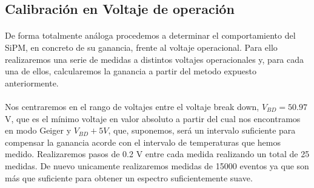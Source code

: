 \documentclass[11pt, a4paper]{article}
\begin{document}
\subsection {Calibración en Voltaje de operación}
\paragraph {}
De forma totalmente análoga procedemos a determinar el comportamiento del SiPM, en concreto de su ganancia, frente al voltaje operacional. Para ello realizaremos una serie de medidas a distintos voltajes operacionales y, para cada una de ellos, calcularemos la ganancia a partir del metodo expuesto anteriormente. 

\paragraph {}
Nos centraremos en el rango de voltajes entre el voltaje break down, $V_{BD}= 50.97$ V, que es el mínimo voltaje en valor absoluto a partir del cual nos encontramos en modo Geiger y $V_{BD}+5V$, que, suponemos, será un intervalo suficiente para compensar la ganancia acorde con el intervalo de temperaturas que hemos medido. Realizaremos pasos de 0.2 V entre cada medida realizando un total de 25 medidas. De nuevo unicamente realizaremos medidas de 15000 eventos ya que son más que suficiente para obtener un espectro suficientemente suave.
\end{document}
